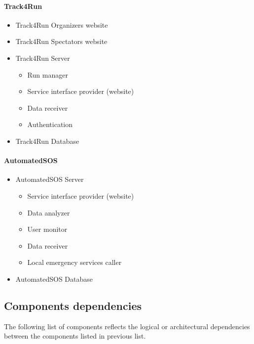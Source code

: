 			\paragraph{Track4Run}
			\begin{itemize}
				\item{Track4Run Organizers website}
				\item{Track4Run Spectators website}
				\item{Track4Run Server}
					\begin{itemize}
						\item{Run manager}
						\item{Service interface provider (website)}
						\item{Data receiver}
						\item{Authentication}
					\end{itemize}
				\item{Track4Run Database}
			\end{itemize}
			\paragraph{AutomatedSOS}
			\begin{itemize}
				\item{AutomatedSOS Server}
					\begin{itemize}
						\item{Service interface provider (website)}
						\item{Data analyzer}
						\item{User monitor}
						\item{Data receiver}
						\item{Local emergency services caller}
					\end{itemize}
				\item{AutomatedSOS Database}
			\end{itemize}

		\subsection{Components dependencies}
		The following list of components reflects the logical or architectural dependencies between the components listed in previous list.
